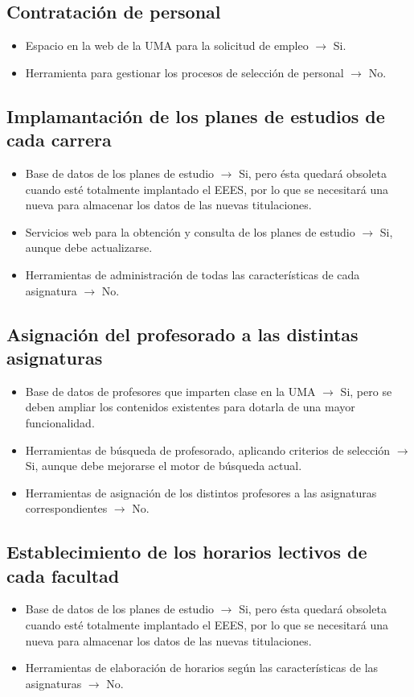 \documentclass[11pt,a4paper,spanish,twoside]{book}
\begin{document}
\begin{itemize}
\subsection{Contratación de personal}
\begin{itemize}
\item Espacio en la web de la UMA para la solicitud de empleo $\to$ Si.
\item Herramienta para gestionar los procesos de selección de personal $\to$ No.
\end{itemize}

\subsection{Implamantación de los planes de estudios de cada carrera}
\begin{itemize}
\item Base de datos de los planes de estudio $\to$ Si, pero ésta quedará obsoleta cuando esté totalmente implantado el EEES, por lo que se necesitará una nueva para almacenar los datos de las nuevas titulaciones.
\item Servicios web para la obtención y consulta de los planes de estudio $\to$ Si, aunque debe actualizarse.
\item Herramientas de administración de todas las características de cada asignatura $\to$ No.
\end{itemize}

\subsection{Asignación del profesorado a las distintas asignaturas}
\begin{itemize}
\item Base de datos de profesores que imparten clase en la UMA $\to$ Si, pero se deben ampliar los contenidos existentes para dotarla de una mayor funcionalidad.
\item Herramientas de búsqueda de profesorado, aplicando criterios de selección $\to$ Si, aunque debe mejorarse el motor de búsqueda actual.
\item Herramientas de asignación de los distintos profesores a las asignaturas correspondientes $\to$ No.
\end{itemize}

\subsection{Establecimiento de los horarios lectivos de cada facultad}
\begin{itemize}
\item Base de datos de los planes de estudio $\to$ Si, pero ésta quedará obsoleta cuando esté totalmente implantado el EEES, por lo que se necesitará una nueva para almacenar los datos de las nuevas titulaciones.
\item Herramientas de elaboración de horarios según las características de las asignaturas $\to$ No.
\end{itemize}


\end{itemize}
\end{document}
